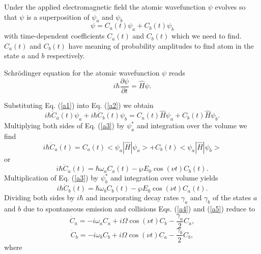 Under the applied electromagnetic field the atomic wavefunction $\psi $
evolves so that $\psi $ is a superposition of $\psi _{a}$ and $\psi _{b}$
\begin{equation}
  \psi =C_{a}(t)\psi _{a}+C_{b}(t)\psi _{b}  \label{a1}
\end{equation}%
with time-dependent coefficients $C_{a}(t)$ and $C_{b}(t)$ which we need to
find. $C_{a}(t)$ and $C_{b}(t)$ have meaning of probability amplitudes to
find atom in the state $a$ and $b$ respectively.

Schr\"{o}dinger equation for the atomic wavefunction $\psi $ reads%
\begin{equation}
  i\hbar \frac{\partial \psi }{\partial t}=\hat{H}\psi .  \label{a2}
\end{equation}

Substituting Eq. (\ref{a1}) into Eq. (\ref{a2}) we obtain%
\begin{equation}
  i\hbar \dot{C}_{a}(t)\psi _{a}+i\hbar \dot{C}_{b}(t)\psi _{b}=C_{a}(t)\hat{H}%
  \psi _{a}+C_{b}(t)\hat{H}\psi _{b}.  \label{a3}
\end{equation}%
Multiplying both sides of Eq. (\ref{a3}) by $\psi _{a}^{\ast }$ and
integration over the volume we find
\begin{equation}
  i\hbar \dot{C}_{a}(t)=C_{a}(t)<\psi _{a}|\hat{H}|\psi _{a}>+C_{b}(t)<\psi
  _{a}|\hat{H}|\psi _{b}>
\end{equation}%
or
\begin{equation}
  i\hbar \dot{C}_{a}(t)=\hbar \omega _{a}C_{a}(t)-\wp E_{0}\cos (\nu
  t)C_{b}(t).  \label{a4}
\end{equation}%
Multiplication of Eq. (\ref{a3}) by $\psi _{b}^{\ast }$ and integration over
volume yields%
\begin{equation}
  i\hbar \dot{C}_{b}(t)=\hbar \omega _{b}C_{b}(t)-\wp E_{0}\cos (\nu
  t)C_{a}(t).  \label{a5}
\end{equation}%
Dividing both sides by $i\hbar $ and incorporating decay rates $\gamma _{a}$
and $\gamma _{b}$ of the states $a$ and $b$ due to spontaneous emission and
collisions Eqs. (\ref{a4}) and (\ref{a5}) reduce to
\begin{equation}
  \dot{C}_{a}=-i\omega _{a}C_{a}+i\Omega \cos (\nu t)C_{b}-\frac{\gamma _{a}}{2%
  }C_{a},  \label{a6}
\end{equation}%
\begin{equation}
  \dot{C}_{b}=-i\omega _{b}C_{b}+i\Omega \cos (\nu t)C_{a}-\frac{\gamma _{b}}{2%
  }C_{b},  \label{a7}
\end{equation}%
where

